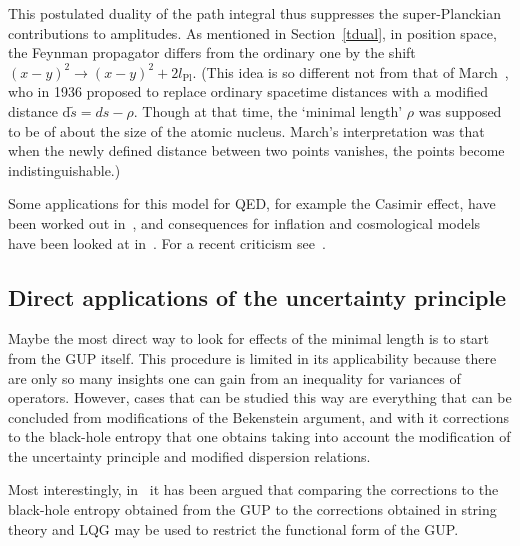 \documentclass{article}
\begin{document}
This postulated duality of the path integral thus suppresses the super-Planckian contributions to amplitudes. As mentioned in Section~\ref{tdual}, in
position space, the Feynman propagator differs from the ordinary one by the shift $(x-y)^2 \to (x-y)^2 + 2l_{\mathrm{Pl}}$. (This idea is so 
different not from that of March~\cite{March}, who in 1936
proposed to replace ordinary spacetime distances with a modified distance $\mathrm{d}\tilde{s}= ds - \rho$. Though at that time,
the `minimal length' $\rho$ was supposed to be of about the size of the atomic nucleus. March's interpretation was that
when the newly defined distance between two points vanishes, the points become indistinguishable.)

Some applications for this model for {\sc QED}, for example the Casimir effect, have been worked out in~\cite{Srinivasan:1997rs,Shankaranarayanan:2000sp}, 
and consequences for inflation and cosmological models have been looked at in~\cite{Sriramkumar:2006qt,Kothawala:2009fa}. For a recent
criticism see~\cite{Campo:2010ce}.

\subsection{Direct applications of the uncertainty principle}

Maybe the most direct way to look for effects of the minimal length is to start from the
GUP itself. This procedure is limited in its applicability
because there are only so many insights one can gain from an inequality for variances of
operators. However, cases that can be studied this way are everything that can be concluded from 
modifications of
the Bekenstein argument, and with it corrections to the black-hole entropy that one obtains 
taking into account the modification of the uncertainty principle and 
modified dispersion relations.

Most interestingly, in~\cite{Medved:2004yu,AmelinoCamelia:2004fk} it has been argued that comparing
the corrections to the black-hole entropy obtained from the {\sc GUP} to the corrections obtained in 
string theory and LQG may be used to restrict the functional form of the {\sc GUP}. 
\end{document}
